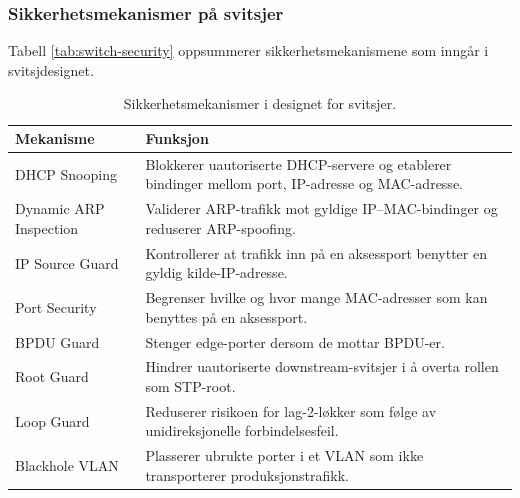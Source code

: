 \subsubsection{Sikkerhetsmekanismer på svitsjer}
Tabell \ref{tab:switch-security} oppsummerer sikkerhetsmekanismene som inngår i svitsjdesignet.

\begin{table}[H]

\centering
\caption{Sikkerhetsmekanismer i designet for svitsjer.}
\vspace{5pt}
\small

\setlength{\tabcolsep}{6pt}


\begin{tabular}{
    >{\raggedright\arraybackslash}p{3.8cm}
    >{\raggedright\arraybackslash}p{9.9cm}
}

\toprule

\rowcolor{tablegreen}
\color{white}\textbf{Mekanisme} &
\color{white}\textbf{Funksjon} \\

\midrule

DHCP Snooping &
Blokkerer uautoriserte DHCP-servere og etablerer bindinger mellom port, IP-adresse og MAC-adresse. \\

Dynamic ARP Inspection &
Validerer ARP-trafikk mot gyldige IP--MAC-bindinger og reduserer ARP-spoofing. \\

IP Source Guard &
Kontrollerer at trafikk inn på en aksessport benytter en gyldig kilde-IP-adresse. \\

Port Security &
Begrenser hvilke og hvor mange MAC-adresser som kan benyttes på en aksessport. \\

BPDU Guard &
Stenger edge-porter dersom de mottar BPDU-er. \\

Root Guard &
Hindrer uautoriserte downstream-svitsjer i å overta rollen som STP-root. \\

Loop Guard &
Reduserer risikoen for lag-2-løkker som følge av unidireksjonelle forbindelsesfeil. \\

Blackhole VLAN &
Plasserer ubrukte porter i et VLAN som ikke transporterer produksjonstrafikk. \\


\end{tabular}
\end{table}
